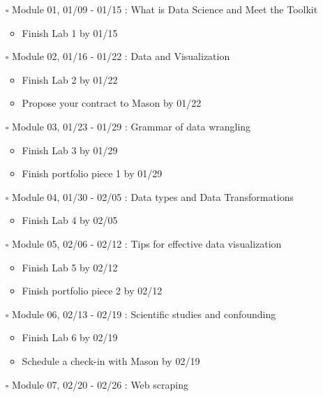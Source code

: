 \documentclass[
]{article}
\providecommand{\tightlist}{%
  \setlength{\itemsep}{0pt}\setlength{\parskip}{0pt}}
\begin{document}
\begin{itemize}
\item[$\square$]
  Module 01, 01/09 - 01/15 : What is Data Science and Meet the Toolkit

  \begin{itemize}
  \tightlist
  \item
    Finish Lab 1 by 01/15
  \end{itemize}
\item[$\square$]
  Module 02, 01/16 - 01/22 : Data and Visualization

  \begin{itemize}
  \tightlist
  \item
    Finish Lab 2 by 01/22
  \item
    Propose your contract to Mason by 01/22
  \end{itemize}
\item[$\square$]
  Module 03, 01/23 - 01/29 : Grammar of data wrangling

  \begin{itemize}
  \tightlist
  \item
    Finish Lab 3 by 01/29
  \item
    Finish portfolio piece 1 by 01/29
  \end{itemize}
\item[$\square$]
  Module 04, 01/30 - 02/05 : Data types and Data Transformations

  \begin{itemize}
  \tightlist
  \item
    Finish Lab 4 by 02/05
  \end{itemize}
\item[$\square$]
  Module 05, 02/06 - 02/12 : Tips for effective data visualization

  \begin{itemize}
  \tightlist
  \item
    Finish Lab 5 by 02/12
  \item
    Finish portfolio piece 2 by 02/12
  \end{itemize}
\item[$\square$]
  Module 06, 02/13 - 02/19 : Scientific studies and confounding

  \begin{itemize}
  \tightlist
  \item
    Finish Lab 6 by 02/19
  \item
    Schedule a check-in with Mason by 02/19
  \end{itemize}
\item[$\square$]
  Module 07, 02/20 - 02/26 : Web scraping


\end{itemize}
\end{document}
